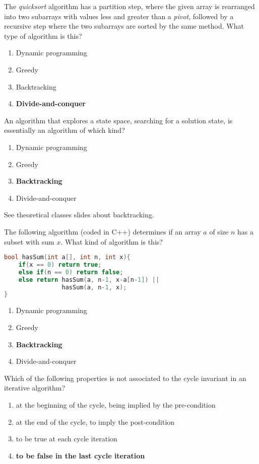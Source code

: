 \documentclass{cal}
\begin{document}
{
The \emph{quicksort} algorithm has a partition step, where the given array is rearranged into two subarrays with values less and greater than a \emph{pivot}, followed by a recursive step where the two subarrays are sorted by the same method. What type of algorithm is this?
\begin{enumerate}[label=\Alph*)]\itemsep0em
    \item Dynamic programming
    \item Greedy 
    \item Backtracking
    \item \textbf{Divide-and-conquer \greencheckmark}
\end{enumerate}

An algorithm that explores a state space, searching for a solution state, is essentially an algorithm of which kind?
\begin{enumerate}[label=\Alph*)]\itemsep0em
    \item Dynamic programming
    \item Greedy 
    \item \textbf{Backtracking \greencheckmark}
    \item Divide-and-conquer
\end{enumerate}

\ansseparator

See theoretical classes slides about backtracking.

The following algorithm (coded in C++) determines if an array $a$ of size $n$ has a subset with sum $x$. What kind of algorithm is this?

\begin{lstlisting}[language=C++]
bool hasSum(int a[], int n, int x){
    if(x == 0) return true;
    else if(n == 0) return false;
    else return hasSum(a, n-1, x-a[n-1]) ||
                hasSum(a, n-1, x);
}
\end{lstlisting}
\begin{enumerate}[label=\Alph*)]\itemsep0em
    \item Dynamic programming
    \item Greedy 
    \item \textbf{Backtracking \greencheckmark}
    \item Divide-and-conquer
\end{enumerate}

Which of the following properties is not associated to the cycle invariant in an iterative algorithm?
\begin{enumerate}[label=\Alph*)]\itemsep0em
    \item at the beginning of the cycle, being implied by the pre-condition
    \item at the end of the cycle, to imply the post-condition
    \item to be true at each cycle iteration
    \item \textbf{to be false in the last cycle iteration \greencheckmark}
\end{enumerate}

}
\end{document}
